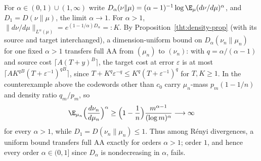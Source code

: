\begin{remark}
\label{ian:hard-sector-renyi-threshold}
For \(\alpha\in(0,1)\cup(1,\infty)\) write
\(D_\alpha(\nu\|\mu)=(\alpha-1)^{-1}\log\E_\mu(d\nu/d\mu)^\alpha\), and
\(D_1=D(\nu\|\mu)\), the limit \(\alpha\to1\). For \(\alpha>1\),
\(\|d\nu/d\mu\|_{L^\alpha(\mu)}=e^{(1-1/\alpha)D_\alpha}=:K\). By
Proposition~\ref{tht:density-prop} (with its source and target
interchanged), a dimension-uniform bound on \(D_\alpha(\nu_n\|\mu_n)\)
for one fixed \(\alpha>1\) transfers full AA from \((\mu_n)\) to
\((\nu_n)\): with \(q=\alpha/(\alpha-1)\) and source cost
\(\lceil A(T+y)^B\rceil\), the target cost at error \(\varepsilon\) is at
most \(\lceil AK^{qB}(T+\varepsilon^{-1})^{qB}\rceil\), since
\(T+K^q\varepsilon^{-q}\le K^q(T+\varepsilon^{-1})^q\) for \(T,K\ge1\). In the counterexample above the
codewords other than \(c_0\) carry \(\mu_n\)-mass \(p_m(1-1/n)\) and
density ratio \(q_m/p_m\), so
\[
 \E_{\mu_n}\Bigl(\frac{d\nu_n}{d\mu_n}\Bigr)^\alpha
 \ge\Bigl(1-\frac1n\Bigr)\frac{m^{\alpha-1}}{(\log m)^\alpha}
 \longrightarrow\infty
\]
for every \(\alpha>1\), while \(D_1=D(\nu_n\|\mu_n)\le1\). Thus among
R\'enyi divergences, a uniform bound transfers full AA exactly for
orders \(\alpha>1\); order \(1\), and hence every order
\(\alpha\in(0,1]\) since \(D_\alpha\) is nondecreasing in \(\alpha\),
fails.
\end{remark}
